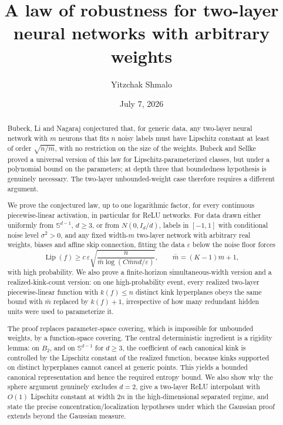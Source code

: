 \documentclass[11pt,reqno]{amsart}
\title[Law of robustness for two-layer networks]{A law of robustness for two-layer neural networks with arbitrary weights}
\author{Yitzchak Shmalo}
\date{July 7, 2026}
\theoremstyle{plain}
\theoremstyle{definition}
\theoremstyle{remark}
\begin{document}
\begin{abstract}
Bubeck, Li and Nagaraj conjectured that, for generic data, any two-layer neural network with $m$ neurons that fits $n$ noisy labels must have Lipschitz constant at least of order $\sqrt{n/m}$, with no restriction on the size of the weights. Bubeck and Sellke proved a universal version of this law for Lipschitz-parameterized classes, but under a polynomial bound on the parameters; at depth three that boundedness hypothesis is genuinely necessary. The two-layer unbounded-weight case therefore requires a different argument.

We prove the conjectured law, up to one logarithmic factor, for every continuous piecewise-linear activation, in particular for ReLU networks. For data drawn either uniformly from $\mathbb S^{d-1}$, $d\ge3$, or from $N(0,I_d/d)$, labels in $[-1,1]$ with conditional noise level $\sigma^2>0$, and any fixed width-$m$ two-layer network with arbitrary real weights, biases and affine skip connection, fitting the data $\varepsilon$ below the noise floor forces
\[
        \operatorname{Lip}(f)\ge c\,\varepsilon\sqrt{\frac{n}{\bar m\log(C\bar mnd/\varepsilon)}},
        \qquad \bar m=(K-1)m+1,
\]
with high probability. We also prove a finite-horizon simultaneous-width version and a realized-kink-count version: on one high-probability event, every realized two-layer piecewise-linear function with $k(f)\le n$ distinct kink hyperplanes obeys the same bound with $\bar m$ replaced by $k(f)+1$, irrespective of how many redundant hidden units were used to parameterize it.

The proof replaces parameter-space covering, which is impossible for unbounded weights, by a function-space covering. The central deterministic ingredient is a rigidity lemma: on $B_2$, and on $\mathbb S^{d-1}$ for $d\ge3$, the coefficient of each canonical kink is controlled by the Lipschitz constant of the realized function, because kinks supported on distinct hyperplanes cannot cancel at generic points. This yields a bounded canonical representation and hence the required entropy bound. We also show why the sphere argument genuinely excludes $d=2$, give a two-layer ReLU interpolant with $O(1)$ Lipschitz constant at width $2n$ in the high-dimensional separated regime, and state the precise concentration/localization hypotheses under which the Gaussian proof extends beyond the Gaussian measure.
\end{abstract}

\maketitle
\end{document}
